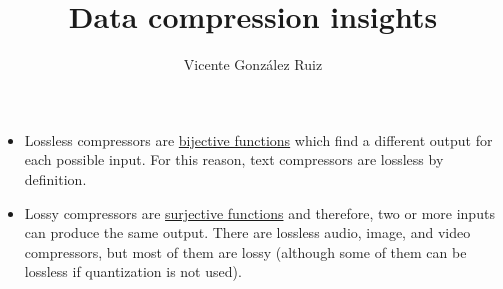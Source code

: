 \title{Data compression insights}
\author{Vicente González Ruiz}
\maketitle


\begin{itemize}

\item Lossless compressors are
  \href{https://en.wikipedia.org/wiki/Bijection}{bijective functions}
  which find a different output for each possible input. For this
  reason, text compressors are lossless by definition.


\item Lossy compressors are
  \href{https://en.wikipedia.org/wiki/Surjective_function}{surjective
    functions} and therefore, two or more inputs can produce the same
  output. There are lossless audio, image, and video compressors, but
  most of them are lossy (although some of them can be lossless if
  quantization is not used).

  
\end{itemize}

